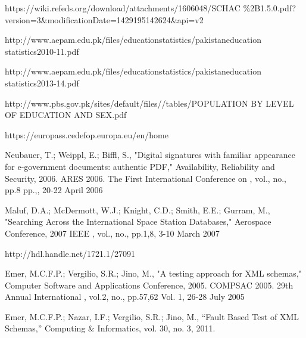 \documentclass[12pt,a4paper,oneside]{book}
\begin{document}
\begin{thebibliography}{10}
https://wiki.refeds.org/download/attachments/1606048/SCHAC
\%2B1.5.0.pdf?version=3\&modificationDate=1429195142624\&api=v2

http://www.aepam.edu.pk/files/educationstatistics/pakistaneducation
statistics2010-11.pdf

http://www.aepam.edu.pk/files/educationstatistics/pakistaneducation
statistics2013-14.pdf

http://www.pbs.gov.pk/sites/default/files//tables/POPULATION BY LEVEL OF EDUCATION AND SEX.pdf

https://europass.cedefop.europa.eu/en/home

Neubauer, T.; Weippl, E.; Biffl, S., "Digital signatures with familiar appearance for e-government documents: authentic PDF," Availability, Reliability and Security, 2006. ARES 2006. The First International Conference on , vol., no., pp.8 pp.,, 20-22 April 2006

Maluf, D.A.; McDermott, W.J.; Knight, C.D.; Smith, E.E.; Gurram, M., "Searching Across the International Space Station Databases," Aerospace Conference, 2007 IEEE , vol., no., pp.1,8, 3-10 March 2007

http://hdl.handle.net/1721.1/27091

Emer, M.C.F.P.; Vergilio, S.R.; Jino, M., "A testing approach for XML schemas," Computer Software and Applications Conference, 2005. COMPSAC 2005. 29th Annual International , vol.2, no., pp.57,62 Vol. 1, 26-28 July 2005

Emer, M.C.F.P.; Nazar, I.F.; Vergilio, S.R.; Jino, M., “Fault Based Test of XML Schemas,” Computing \& Informatics, vol. 30, no. 3, 2011.

\end{thebibliography}
\end{document}
